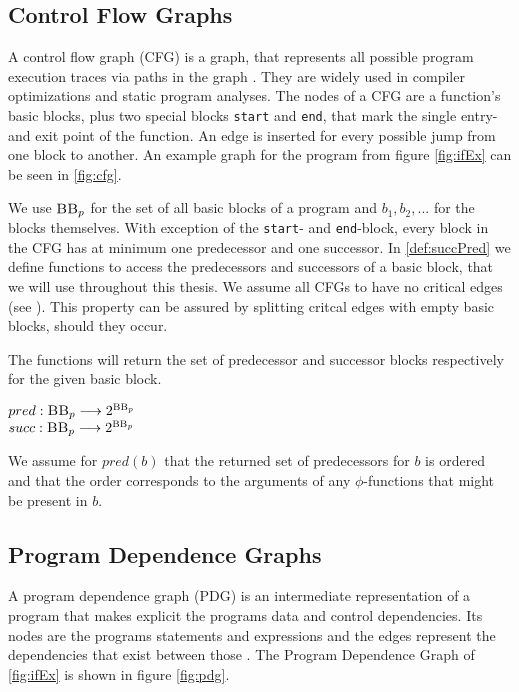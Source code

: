 \subsection{Control Flow Graphs}
A control flow graph (CFG) is a graph, that represents all possible program execution traces via paths in the graph \cite{allen70}. They are widely used in compiler optimizations and static program analyses. The nodes of a CFG are a function's basic blocks, plus two special blocks \texttt{start} and \texttt{end}, that mark the single entry- and exit point of the function. An edge is inserted for every possible jump from one block to another. An example graph for the program from figure \ref{fig:ifEx} can be seen in \ref{fig:cfg}.

We use $\mbb_p$ for the set of all basic blocks of a program \p and $b_1, b_2, ...$ for the blocks themselves. With exception of the \texttt{start}- and \texttt{end}-block, every block in the CFG has at minimum one predecessor and one successor. In \ref{def:succPred} we define functions to access the predecessors and successors of a basic block, that we will use throughout this thesis. We assume all CFGs to have no critical edges (see \cite{dragoonBook}). This property can be assured by splitting critcal edges with empty basic blocks, should they occur. 

\begin{definition}\label{def:succPred}
    The functions will return the set of predecessor and successor blocks respectively for the given basic block.
    \begin{center}
        $pred: \textsc{BB}_p \longrightarrow 2^{\textsc{BB}_p}$\\
        $succ: \textsc{BB}_p \longrightarrow 2^{\textsc{BB}_p}$
    \end{center}
    We assume for $pred(b)$ that the returned set of predecessors for $b$ is ordered and that the order corresponds to the arguments of any $\phi$-functions that might be present in $b$.
\end{definition}

\subsection{Program Dependence Graphs}
A program dependence graph (PDG) is an intermediate representation of a program that makes explicit the programs data and control dependencies. Its nodes are the programs statements and expressions and the edges represent the dependencies that exist between those \cite{ferrante87}. The Program Dependence Graph of \ref{fig:ifEx} is shown in figure \ref{fig:pdg}.

